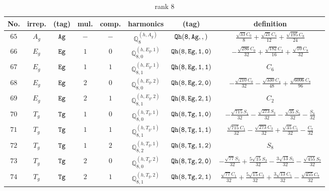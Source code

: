 \documentclass[fleqn,8pt]{jsarticle}
\begin{document}
\begin{table}[ht!]
\begin{center}
\caption{rank 8}
\renewcommand{\arraystretch}{1.3}
\begin{tabular}{cccccccc} \hline \hline
No. & irrep. & (tag) & mul. & comp. & harmonics & (tag) & definition \\ \hline
$ 65 $ & $ A_{g} $ & $ {\tt Ag} $ & $ - $ & $ - $ & $ \mathbb{Q}_{8}^{(h,A_{g})} $ & $ {\tt Qh(8,Ag,,)} $ & $ \frac{\sqrt{33} C_{0}}{8} + \frac{\sqrt{21} C_{4}}{12} + \frac{\sqrt{195} C_{8}}{24} $ \\
$ 66 $ & $ E_{g} $ & $ {\tt Eg} $ & $ 1 $ & $ 0 $ & $ \mathbb{Q}_{8,0}^{(h,E_{g},1)} $ & $ {\tt Qh(8,Eg,1,0)} $ & $ - \frac{\sqrt{286} C_{0}}{32} + \frac{\sqrt{182} C_{4}}{16} + \frac{\sqrt{10} C_{8}}{32} $ \\
$ 67 $ & $ E_{g} $ & $ {\tt Eg} $ & $ 1 $ & $ 1 $ & $ \mathbb{Q}_{8,1}^{(h,E_{g},1)} $ & $ {\tt Qh(8,Eg,1,1)} $ & $ C_{6} $ \\
$ 68 $ & $ E_{g} $ & $ {\tt Eg} $ & $ 2 $ & $ 0 $ & $ \mathbb{Q}_{8,0}^{(h,E_{g},2)} $ & $ {\tt Qh(8,Eg,2,0)} $ & $ - \frac{\sqrt{210} C_{0}}{32} - \frac{\sqrt{330} C_{4}}{48} + \frac{\sqrt{6006} C_{8}}{96} $ \\
$ 69 $ & $ E_{g} $ & $ {\tt Eg} $ & $ 2 $ & $ 1 $ & $ \mathbb{Q}_{8,1}^{(h,E_{g},2)} $ & $ {\tt Qh(8,Eg,2,1)} $ & $ C_{2} $ \\
$ 70 $ & $ T_{g} $ & $ {\tt Tg} $ & $ 1 $ & $ 0 $ & $ \mathbb{Q}_{8,0}^{(h,T_{g},1)} $ & $ {\tt Qh(8,Tg,1,0)} $ & $ - \frac{\sqrt{715} S_{1}}{32} - \frac{\sqrt{273} S_{3}}{32} - \frac{\sqrt{35} S_{5}}{32} - \frac{S_{7}}{32} $ \\
$ 71 $ & $ T_{g} $ & $ {\tt Tg} $ & $ 1 $ & $ 1 $ & $ \mathbb{Q}_{8,1}^{(h,T_{g},1)} $ & $ {\tt Qh(8,Tg,1,1)} $ & $ \frac{\sqrt{715} C_{1}}{32} - \frac{\sqrt{273} C_{3}}{32} + \frac{\sqrt{35} C_{5}}{32} - \frac{C_{7}}{32} $ \\
$ 72 $ & $ T_{g} $ & $ {\tt Tg} $ & $ 1 $ & $ 2 $ & $ \mathbb{Q}_{8,2}^{(h,T_{g},1)} $ & $ {\tt Qh(8,Tg,1,2)} $ & $ S_{8} $ \\
$ 73 $ & $ T_{g} $ & $ {\tt Tg} $ & $ 2 $ & $ 0 $ & $ \mathbb{Q}_{8,0}^{(h,T_{g},2)} $ & $ {\tt Qh(8,Tg,2,0)} $ & $ - \frac{\sqrt{77} S_{1}}{32} + \frac{5 \sqrt{15} S_{3}}{32} - \frac{3 \sqrt{13} S_{5}}{32} - \frac{\sqrt{455} S_{7}}{32} $ \\
$ 74 $ & $ T_{g} $ & $ {\tt Tg} $ & $ 2 $ & $ 1 $ & $ \mathbb{Q}_{8,1}^{(h,T_{g},2)} $ & $ {\tt Qh(8,Tg,2,1)} $ & $ \frac{\sqrt{77} C_{1}}{32} + \frac{5 \sqrt{15} C_{3}}{32} + \frac{3 \sqrt{13} C_{5}}{32} - \frac{\sqrt{455} C_{7}}{32} $ \\

\end{tabular}
\end{center}
\end{table}
\end{document}

